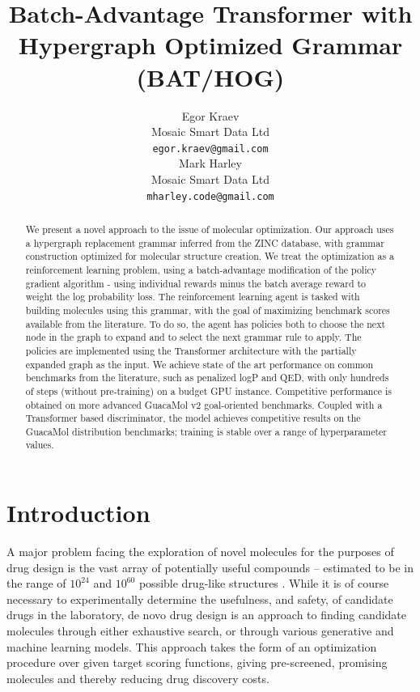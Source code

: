 \documentclass{article}
\title{Batch-Advantage Transformer with Hypergraph Optimized Grammar (BAT/HOG)}
\author{%
  Egor Kraev \\
  Mosaic Smart Data Ltd \\
  \texttt{egor.kraev@gmail.com} \\
  \And
  Mark Harley \\
  Mosaic Smart Data Ltd \\
  \texttt{mharley.code@gmail.com}
}
\begin{document}
\maketitle

\begin{abstract}
We present a novel approach to the issue of molecular optimization. Our approach uses a hypergraph replacement grammar inferred from the ZINC database, with grammar construction optimized for molecular structure creation. We treat the optimization as a reinforcement learning problem, using a batch-advantage modification of the policy gradient algorithm - using individual rewards minus the batch average reward to weight the log probability loss. The reinforcement learning agent is tasked with building molecules using this grammar, with the goal of maximizing benchmark scores available from the literature. To do so, the agent has policies both to choose the next node in the graph to expand and to select the next grammar rule to apply. The policies are implemented using the Transformer architecture with the partially expanded graph as the input. We achieve state of the art performance on common benchmarks from the literature, such as penalized logP and QED, with only hundreds of steps (without pre-training) on a budget GPU instance. Competitive performance is obtained on more advanced GuacaMol v2 goal-oriented benchmarks. Coupled with a Transformer based discriminator, the model achieves competitive results on the GuacaMol distribution benchmarks; training is stable over a range of hyperparameter values.
\end{abstract}

\section{Introduction}\label{sec:intro}
A major problem facing the exploration of novel molecules for the purposes of drug design is the vast array of potentially useful compounds -- estimated to be in the range of $10^{24}$ and $10^{60}$ possible drug-like structures \cite{walters2019, ruddigkeit2012}. While it is of course necessary to experimentally determine the usefulness, and safety, of candidate drugs in the laboratory, de novo drug design is an approach to finding candidate molecules through either exhaustive search, or through various generative and machine learning models. This approach takes the form of an optimization procedure over given target scoring functions, giving pre-screened, promising molecules and thereby reducing drug discovery costs.
\end{document}
